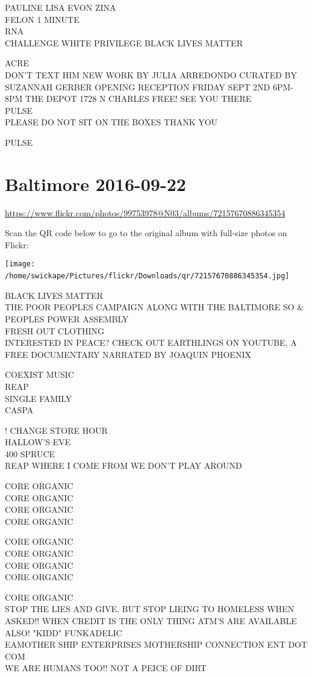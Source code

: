 \documentclass[10pt,letterpaper]{article}
\begin{document}
PAULINE LISA EVON ZINA\\
FELON 1 MINUTE\\
RNA\\
CHALLENGE WHITE PRIVILEGE BLACK LIVES MATTER

ACRE\\
DON'T TEXT HIM NEW WORK BY JULIA ARREDONDO CURATED BY SUZANNAH GERBER OPENING RECEPTION FRIDAY SEPT 2ND 6PM{-}8PM THE DEPOT 1728 N CHARLES FREE! SEE YOU THERE\\
PULSE\\
PLEASE DO NOT SIT ON THE BOXES THANK YOU

PULSE
\

\section*{Baltimore 2016-09-22}

\url{https://www.flickr.com/photos/99753978@N03/albums/72157670886345354}

Scan the QR code below to go to the original album with full-size photos on Flickr:

\texttt{[image: /home/swickape/Pictures/flickr/Downloads/qr/72157670886345354.jpg]}
\

BLACK LIVES MATTER\\
THE POOR PEOPLES CAMPAIGN ALONG WITH THE BALTIMORE SO \& PEOPLES POWER ASSEMBLY\\
FRESH OUT CLOTHING\\
INTERESTED IN PEACE?  CHECK OUT EARTHLINGS ON YOUTUBE, A FREE DOCUMENTARY NARRATED BY JOAQUIN PHOENIX

COEXIST MUSIC\\
REAP\\
SINGLE FAMILY\\
CASPA

! CHANGE STORE HOUR\\
HALLOW'S EVE\\
400 SPRUCE\\
REAP WHERE I COME FROM WE DON'T PLAY AROUND

CORE ORGANIC\\
CORE ORGANIC\\
CORE ORGANIC\\
CORE ORGANIC

CORE ORGANIC\\
CORE ORGANIC\\
CORE ORGANIC\\
CORE ORGANIC

CORE ORGANIC\\
STOP THE LIES AND GIVE, BUT STOP LIEING TO HOMELESS WHEN ASKED!! WHEN CREDIT IS THE ONLY THING ATM'S ARE AVAILABLE ALSO! "KIDD" FUNKADELIC\\
EAMOTHER SHIP ENTERPRISES MOTHERSHIP CONNECTION ENT DOT COM\\
WE ARE HUMANS TOO!! NOT A PEICE OF DIRT
\end{document}
